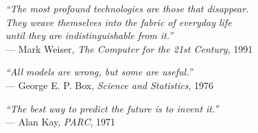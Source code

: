 \begin{epigrafe}
    \vspace*{\fill}
    \noindent
    \begin{flushright}
    \textit{``The most profound technologies are those that disappear.}\\
    \textit{They weave themselves into the fabric of everyday life}\\
    \textit{until they are indistinguishable from it.''}\\[0.3cm]
    --- Mark Weiser, \textit{The Computer for the 21st Century}, 1991\par
    \vspace{1cm}
    \textit{``All models are wrong, but some are useful.''}\\[0.3cm]
    --- George E. P. Box, \textit{Science and Statistics}, 1976\par
    \vspace{1cm}
    \textit{``The best way to predict the future is to invent it.''}\\[0.3cm]
    --- Alan Kay, \textit{PARC}, 1971\par
    \end{flushright}
    \vspace*{\fill}
\end{epigrafe}
